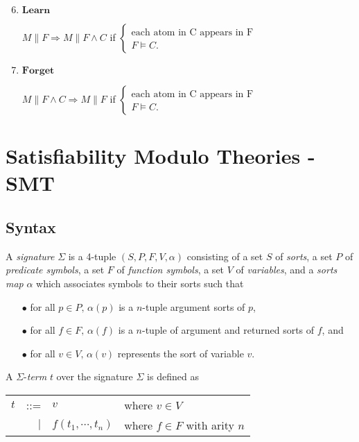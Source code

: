 \begin{enumerate}
\setcounter{enumi}{5}
\item $\mathbf{Learn}$

$M \parallel F \Longrightarrow M \parallel F \wedge C$ if $\left\{ 
  \begin{array}{l}
    \text{each atom in C appears in F} \\
    F \models C.
  \end{array} \right.$ 
  
\item $\mathbf{Forget}$

$M \parallel F \wedge C \Longrightarrow M \parallel F$ if $\left\{ 
  \begin{array}{l}
    \text{each atom in C appears in F} \\
    F \models C.
  \end{array} \right.$   
\end{enumerate}

\section{Satisfiability Modulo Theories - SMT}
\subsection{Syntax} \label{subsection:smt-syntax}
\begin{definition}
A \emph{signature} $\Sigma$ is a 4-tuple $(S, P, F, V, \alpha)$ consisting of a set $S$ of \emph{sorts}, a set $P$ of \emph{predicate symbols}, a set $F$ of \emph{function symbols}, a set $V$ of \emph{variables}, and a \emph{sorts map} $\alpha$ which associates symbols to their sorts such that
\begin{itemize}
\item[$\bullet$] for all $p \in P, \, \alpha(p)$ is a $n$-tuple argument sorts of $p$,
\item[$\bullet$] for all $f \in F, \, \alpha(f)$ is a $n$-tuple of argument and returned sorts of $f$, and
\item[$\bullet$] for all $v \in V, \, \alpha(v)$ represents the sort of variable $v$.
\end{itemize}
\end{definition}
A $\Sigma$-\emph{term} $t$ over the signature $\Sigma$ is defined as
\begin{center}
\begin{tabular}{l r l l}
$t$ &::=& $v$ & where $v \in V$\\ 
&$\mid$ & $f(t_1, \cdots, t_n)$ &where $f \in F$ with arity $n$
\end{tabular}
\end{center}



